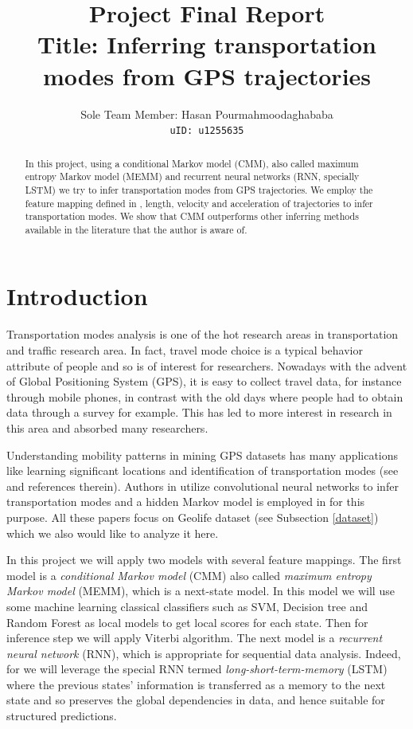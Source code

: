 \documentclass[11pt]{myclass}
\begin{document}
\title{Project Final Report \\ Title: Inferring transportation modes from GPS trajectories}

\author{Sole Team Member: Hasan Pourmahmoodaghababa \\
\texttt{uID: u1255635}}


\maketitle


\begin{abstract}
In this project, using a conditional Markov model (CMM), also called maximum entropy Markov model (MEMM) and recurrent neural networks (RNN, specially LSTM) we try to infer transportation modes from GPS trajectories. We employ the feature mapping defined in \cite{PT19a}, length, velocity and acceleration of trajectories to infer transportation modes. We show that CMM outperforms other inferring methods available in the literature that the author is aware of. 
\end{abstract}


\section{Introduction}

Transportation modes analysis is one of the hot research areas in transportation and traffic research area. In fact, travel mode choice is a typical behavior attribute of people and so is of interest for researchers. Nowadays with the advent of Global Positioning System (GPS), it is easy to collect travel data, for instance through mobile phones, in contrast with the old days where people had to obtain data through a survey for example. This has led to more interest in research in this area and absorbed many researchers. 

Understanding mobility patterns in mining GPS datasets has many applications like learning significant locations and identification of transportation modes (see \cite{LH2014, LS2020, DH2018, DCHR2020} and references therein). Authors in \cite{DH2018, DCHR2020, ETNK2016, WLJL2017} utilize convolutional neural networks to infer transportation modes and a hidden Markov model is employed in \cite{LS2020} for this purpose. All these papers focus on Geolife dataset (see Subsection \ref{dataset}) which we also would like to analyze it here. 

In this project we will apply two models with several feature mappings. The first model is a {\it conditional Markov model} (CMM) also called {\it maximum entropy Markov model} (MEMM), which is a next-state model. In this model we will use some machine learning classical classifiers such as SVM, Decision tree and Random Forest as local models to get local scores for each state. Then for inference step we will apply Viterbi algorithm. The next model is a {\it recurrent neural network} (RNN), which is appropriate for sequential data analysis. Indeed, for we will leverage the special RNN termed {\it long-short-term-memory} (LSTM) where the previous states' information is transferred as a memory to the next state and so preserves the global dependencies in data, and hence suitable for structured predictions. 
\end{document}
